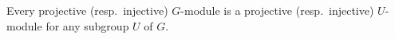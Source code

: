 \begin{corollary}[1.4]
Every projective (resp.\ injective) $G$-module is a projective (resp.\ injective) $U$-module for any subgroup $U$ of $G$.
\end{corollary}
